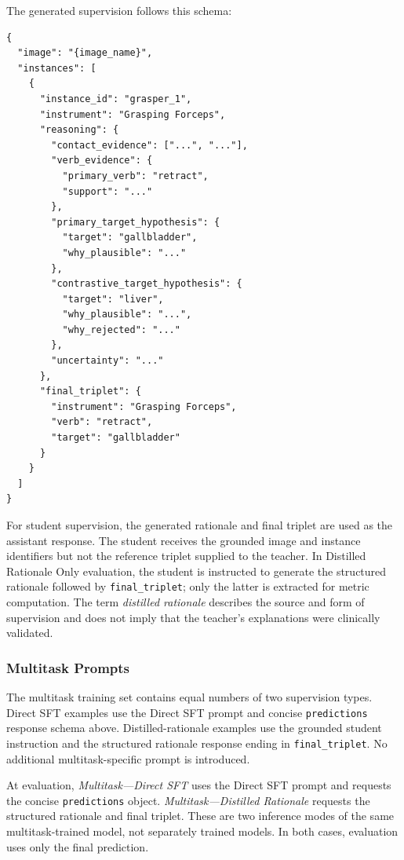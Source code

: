 The generated supervision follows this schema:

\begin{lstlisting}[style=c5prompt]
{
  "image": "{image_name}",
  "instances": [
    {
      "instance_id": "grasper_1",
      "instrument": "Grasping Forceps",
      "reasoning": {
        "contact_evidence": ["...", "..."],
        "verb_evidence": {
          "primary_verb": "retract",
          "support": "..."
        },
        "primary_target_hypothesis": {
          "target": "gallbladder",
          "why_plausible": "..."
        },
        "contrastive_target_hypothesis": {
          "target": "liver",
          "why_plausible": "...",
          "why_rejected": "..."
        },
        "uncertainty": "..."
      },
      "final_triplet": {
        "instrument": "Grasping Forceps",
        "verb": "retract",
        "target": "gallbladder"
      }
    }
  ]
}
\end{lstlisting}

For student supervision, the generated rationale and final triplet are used as the assistant response. The student receives the grounded image and instance identifiers but not the reference triplet supplied to the teacher. In Distilled Rationale Only evaluation, the student is instructed to generate the structured rationale followed by \texttt{final\_triplet}; only the latter is extracted for metric computation. The term \emph{distilled rationale} describes the source and form of supervision and does not imply that the teacher's explanations were clinically validated.

\subsubsection{Multitask Prompts}

The multitask training set contains equal numbers of two supervision types. Direct SFT examples use the Direct SFT prompt and concise \texttt{predictions} response schema above. Distilled-rationale examples use the grounded student instruction and the structured rationale response ending in \texttt{final\_triplet}. No additional multitask-specific prompt is introduced.

At evaluation, \emph{Multitask---Direct SFT} uses the Direct SFT prompt and requests the concise \texttt{predictions} object. \emph{Multitask---Distilled Rationale} requests the structured rationale and final triplet. These are two inference modes of the same multitask-trained model, not separately trained models. In both cases, evaluation uses only the final \ivttriplet prediction.


